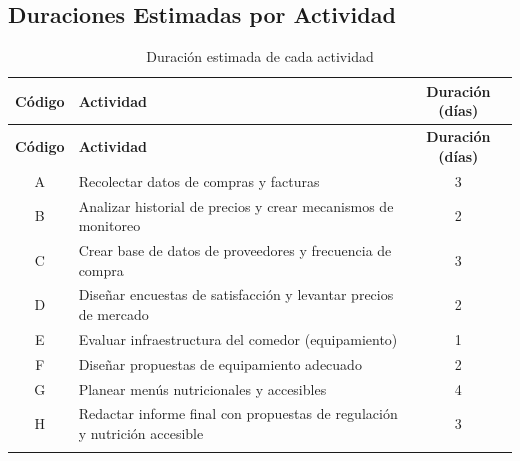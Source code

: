 \documentclass[letterpaper, 11pt]{report}
\begin{document}
\subsection{Duraciones Estimadas por Actividad}

\begin{longtable}{|c|p{.6\linewidth}|c|}
      \hline

      \textbf{Código}                               & \textbf{Actividad}                     & \textbf{Duración (días)} \\
      \hline
      \endfirsthead

      \hline

      \textbf{Código}                               & \textbf{Actividad}                     & \textbf{Duración (días)} \\
      \hline
      \endhead

      A                                             & Recolectar datos de compras y facturas & 3                        \\ \hline B                                   & Analizar historial
      de precios y crear mecanismos de monitoreo    & 2                                                                 \\ \hline C                                    & Crear base de
      datos de proveedores y frecuencia de compra   & 3                                                                 \\ \hline D                                      & Diseñar encuestas
      de satisfacción y levantar precios de mercado & 2                                                                 \\ \hline E                                   & Evaluar
      infraestructura del comedor (equipamiento)    & 1                                                                 \\ \hline F                 & Diseñar propuestas
      de equipamiento adecuado                      & 2                                                                 \\ \hline G   & Planear menús nutricionales y
      accesibles                                    & 4                                                                 \\ \hline H                         & Redactar informe final con propuestas de
      regulación y nutrición accesible              & 3                                                                 \\ \hline

      \caption{Duración estimada de cada actividad}
\end{longtable}
\end{document}
